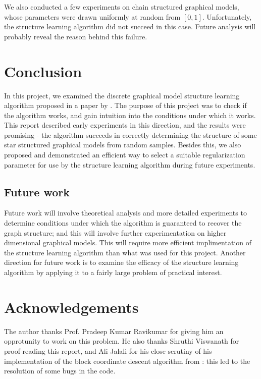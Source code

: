 \documentclass{article}
\begin{document}
We also conducted a few experiments on chain structured graphical models, whose parameters were drawn uniformly at random from $[0, 1]$. Unfortunately, the structure learning algorithm did not succeed in this case. Future analysis will probably reveal the reason behind this failure.

\section{Conclusion}
In this project, we examined the discrete graphical model structure learning algorithm proposed in a paper by \citet{ravikumarIsing09}. The purpose of this project was to check if the algorithm works, and gain intuition into the conditions under which it works. This report described early experiments in this direction, and the results were promising - the algorithm succeeds in correctly determining the structure of some star structured graphical models from random samples. Besides this, we also proposed and demonstrated an efficient way to select a suitable regularization parameter for use by the structure learning algorithm during future experiments.

\subsection{Future work}
Future work will involve theoretical analysis and more detailed experiments to determine conditions under which the algorithm is guaranteed to recover the graph structure; and this will involve further experimentation on higher dimensional graphical models. This will require more efficient implimentation of the structure learning algorithm than what was used for this project. Another direction for future work is to examine the efficacy of the structure learning algorithm by applying it to a fairly large problem of practical interest.

\section{Acknowledgements}
The author thanks Prof. Pradeep Kumar Ravikumar for giving him an opprotunity to work on this problem. He also thanks Shruthi Viswanath for proof-reading this report, and Ali Jalali for his close scrutiny of his implementation of the block coordinate descent algorithm from \citet{meierRS2008}: this led to the resolution of some bugs in the code.



\end{document}
